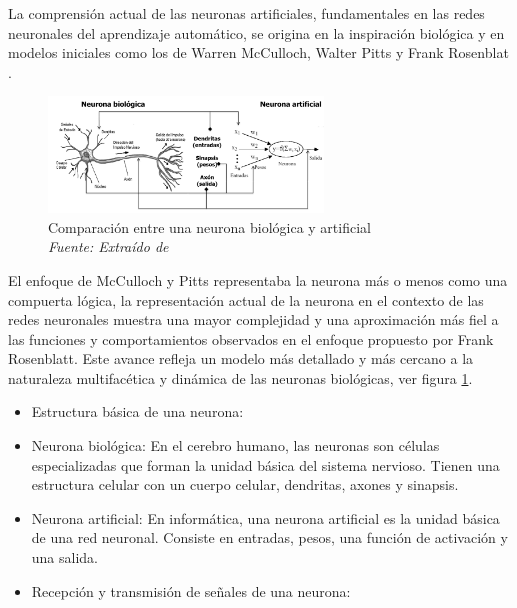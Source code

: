 La comprensión actual de las neuronas artificiales, fundamentales en las redes neuronales del aprendizaje automático, se origina en la inspiración biológica y en modelos iniciales como los de Warren McCulloch, Walter Pitts y Frank Rosenblat . 

\begin{figure}[h!]
	\centering
	\includegraphics[width=0.65\textwidth]{capitulo2/figuras/an5.png}
	\caption{Comparación entre una neurona biológica y  artificial
		\\\textit{Fuente: Extraído de} \protect\cite[p. 4]{lao2017procedimiento}}
	\label{fig:an5}

\end{figure}


El enfoque de McCulloch y Pitts representaba la neurona más  o menos como una compuerta lógica, la representación actual de la neurona en el contexto de las redes neuronales muestra una mayor complejidad y una aproximación más fiel a las funciones y comportamientos observados en el enfoque propuesto por Frank Rosenblatt. Este avance refleja un modelo más detallado y más cercano a la naturaleza multifacética y dinámica de las neuronas biológicas, ver figura \ref{fig:an5}.

\begin{itemize}
\item Estructura básica de una neurona:
\end{itemize}

\begin{itemize}
	\item	 Neurona biológica: En el cerebro humano, las neuronas son células especializadas que forman la unidad básica del sistema nervioso. Tienen una estructura celular con un cuerpo celular, dendritas, axones y sinapsis.
	\item	Neurona artificial: En informática, una neurona artificial es la unidad básica de una red neuronal. Consiste en entradas, pesos, una función de activación y una salida.
\end{itemize}

\begin{itemize}
\item Recepción y transmisión de señales de una neurona:
\end{itemize}

